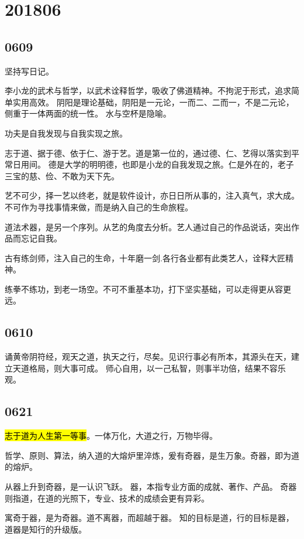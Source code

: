 \section{201806}

\subsection{0609}

坚持写日记。

李小龙的武术与哲学，以武术诠释哲学，吸收了佛道精神。不拘泥于形式，追求简单实用高效。
阴阳是理论基础，阴阳是一元论，一而二、二而一，不是二元论，侧重于一体两面的统一性。
水与空杯是隐喻。

功夫是自我发现与自我实现之旅。

志于道、据于德、依于仁、游于艺。道是第一位的，通过德、仁、艺得以落实到平常日用间。
德是大学的明明德，也即是小龙的自我发现之旅。仁是外在的，老子三宝的慈、俭、不敢为天下先。

艺不可少，择一艺以终老，就是软件设计，亦日日所从事的，注入真气，求大成。
不可作为寻找事情来做，而是纳入自己的生命旅程。

道法术器，是另一个序列。从艺的角度去分析。艺人通过自己的作品说话，突出作品而忘记自我。

古有练剑师，注入自己的生命，十年磨一剑.各行各业都有此类艺人，诠释大匠精神。

练拳不练功，到老一场空。不可不重基本功，打下坚实基础，可以走得更从容更远。

\subsection{0610}

诵黄帝阴符经，观天之道，执天之行，尽矣。见识行事必有所本，其源头在天，建立天道格局，则大事可成。
师心自用，以一己私智，则事半功倍，结果不容乐观。

\subsection{0621}

\hl{志于道为人生第一等事}。一体万化，大道之行，万物毕得。

哲学、原则、算法，纳入道的大熔炉里淬炼，爰有奇器，是生万象。奇器，即为道的熔炉。

从器上升到奇器，是一认识飞跃。
器，本指专业方面的成就、著作、产品。
奇器则指道，在道的光照下，专业、技术的成绩会更有异彩。

寓奇于器，是为奇器。道不离器，而超越于器。
知的目标是道，行的目标是器，道器是知行的升级版。

